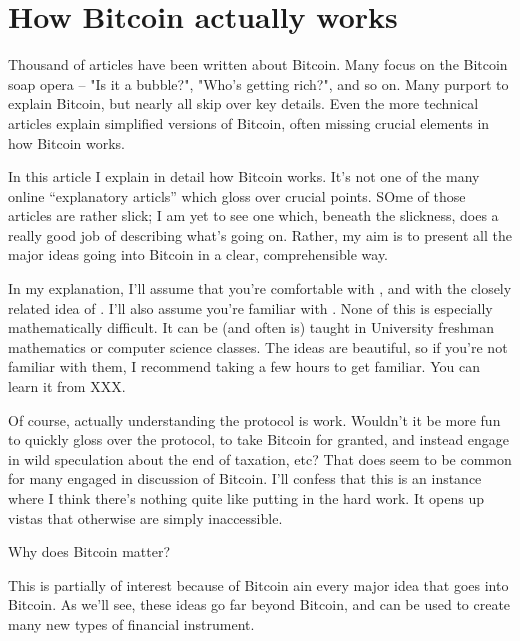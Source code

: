 

\chapter{How Bitcoin actually works}

%
%
Thousand of articles have been written about Bitcoin.  Many focus on
the Bitcoin soap opera -- "Is it a bubble?", "Who's getting rich?",
and so on.  Many purport to explain Bitcoin, but nearly all skip over
key details.  Even the more technical articles explain simplified
versions of Bitcoin, often missing crucial elements in how Bitcoin
works.

%
%
In this article I explain in detail how Bitcoin works.  It's not one
of the many online ``explanatory articls'' which gloss over crucial
points.  SOme of those articles are rather slick; I am yet to see one
which, beneath the slickness, does a really good job of describing
what's going on.  Rather, my aim is to present all the major ideas
going into Bitcoin in a clear, comprehensible way.

%
%
In my explanation, I'll assume that you're comfortable with
, and with the closely related idea of
.  I'll also assume you're familiar with
.  None of this is especially mathematically
difficult.  It can be (and often is) taught in University freshman
mathematics or computer science classes.  The ideas are beautiful, so
if you're not familiar with them, I recommend taking a few hours to
get familiar.  You can learn it from XXX.

%
%
Of course, actually understanding the protocol is work.  Wouldn't it
be more fun to quickly gloss over the protocol, to take Bitcoin for
granted, and instead engage in wild speculation about the end of
taxation, etc?  That does seem to be common for many engaged in
discussion of Bitcoin.  I'll confess that this is an instance where I
think there's nothing quite like putting in the hard work.  It opens
up vistas that otherwise are simply inaccessible.

%
%
Why does Bitcoin matter?

This is
partially of interest because of Bitcoin ain every major idea that
goes into Bitcoin.  As we'll see, these ideas go far beyond Bitcoin,
and can be used to create many new types of financial instrument.


